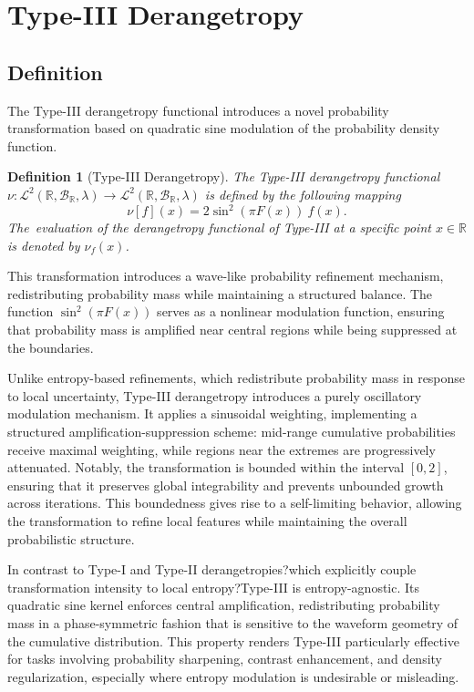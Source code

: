 \documentclass[sn-mathphys-num]{sn-jnl}%
\theoremstyle{thmstyleone}%
\theoremstyle{thmstyletwo}%
\theoremstyle{thmstylethree}%
\newtheorem{definition}{Definition}%
\begin{document}
\section{Type-III Derangetropy}
\label{Sec:Type-III}
\subsection{Definition}

The Type-III derangetropy functional introduces a novel probability transformation based on quadratic sine modulation of the probability density function.



\begin{definition}[Type-III Derangetropy]
	\label{Def:TypeIII}
	The \textit{Type-III derangetropy functional} $\nu: \mathcal{L}^2(\mathbb{R}, \mathscr{B}_{\mathbb{R}}, \lambda) \rightarrow \mathcal{L}^2(\mathbb{R}, \mathscr{B}_{\mathbb{R}}, \lambda)$ is defined by the following mapping
	\begin{equation}
		\nu[f](x) = 2 \sin^2(\pi F(x))\  f(x).
	\end{equation}
	The~evaluation of the derangetropy functional of Type-III at a specific point $x \in \mathbb{R}$ is denoted by $\nu_f(x)$.
\end{definition}

This transformation introduces a wave-like probability refinement mechanism, redistributing probability mass while maintaining a structured balance. The function $\sin ^2(\pi F(x))$ serves as a nonlinear modulation function, ensuring that probability mass is amplified near central regions while being suppressed at the boundaries.

Unlike entropy-based refinements, which redistribute probability mass in response to local uncertainty, Type-III derangetropy introduces a purely oscillatory modulation mechanism. It applies a sinusoidal weighting, implementing a structured amplification-suppression scheme: mid-range cumulative probabilities receive maximal weighting, while regions near the extremes are progressively attenuated. Notably, the transformation is bounded within the interval $[0,2]$, ensuring that it preserves global integrability and prevents unbounded growth across iterations. This boundedness gives rise to a self-limiting behavior, allowing the transformation to refine local features while maintaining the overall probabilistic structure.

In contrast to Type-I and Type-II derangetropies?which explicitly couple transformation intensity to local entropy?Type-III is entropy-agnostic. Its quadratic sine kernel enforces central amplification, redistributing probability mass in a phase-symmetric fashion that is sensitive to the waveform geometry of the cumulative distribution. This property renders Type-III particularly effective for tasks involving probability sharpening, contrast enhancement, and density regularization, especially where entropy modulation is undesirable or misleading.
\end{document}
